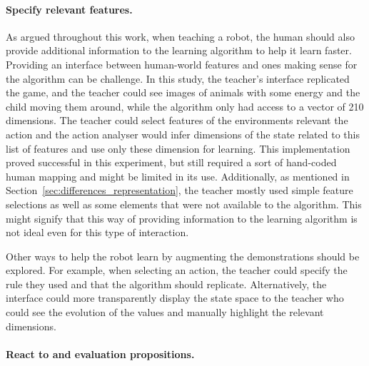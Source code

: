 \paragraph{Specify relevant features.} %

As argued throughout this work, when teaching a robot, the human should also provide additional information to the learning algorithm to help it learn faster. Providing an interface between human-world features and ones making sense for the algorithm can be challenge. 
In this study, the teacher's interface replicated the game, and the teacher could see images of animals with some energy and the child moving them around, while the algorithm only had access to a vector of 210 dimensions. The teacher could select features of the environments relevant the action and the action analyser would infer dimensions of the state related to this list of features and use only these dimension for learning. This implementation proved successful in this experiment, but still required a sort of hand-coded human mapping and might be limited in its use. Additionally, as mentioned in Section~\ref{sec:differences_representation}, the teacher mostly used simple feature selections as well as some elements that were not available to the algorithm. This might signify that this way of providing information to the learning algorithm is not ideal even for this type of interaction.

Other ways to help the robot learn by augmenting the demonstrations should be explored. For example, when selecting an action, the teacher could specify the rule they used and that the algorithm should replicate. Alternatively, the interface could more transparently display the state space to the teacher who could see the evolution of the values and manually highlight the relevant dimensions.

\paragraph{React to and evaluation propositions.} %

